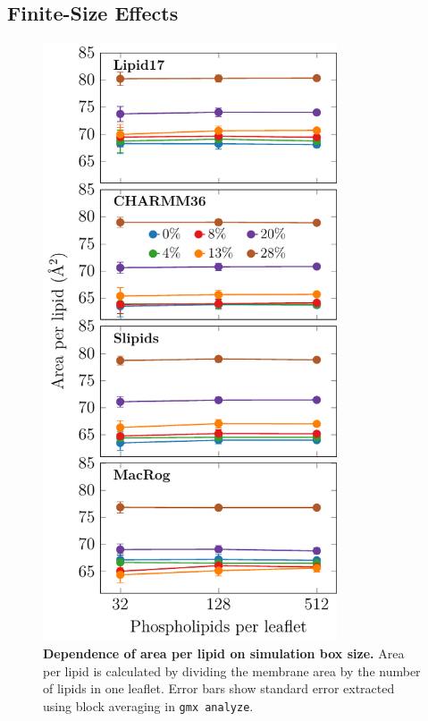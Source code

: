 \documentclass[journal=jpcbfk]{achemso}
\begin{document}
\clearpage
\subsection{Finite-Size Effects}

\begin{figure}[htb!]
    \centering
    \includegraphics[width=8.7cm]{../FIGS/apl_vs_size.pdf}
    \caption{\label{SIfig:aplvssize}%
     \textbf{Dependence of area per lipid on simulation box size.} Area per lipid is calculated by dividing the membrane area by the number of lipids in one leaflet. Error bars show standard error extracted using block averaging in \texttt{gmx analyze}.
    }
\end{figure}
\end{document}
